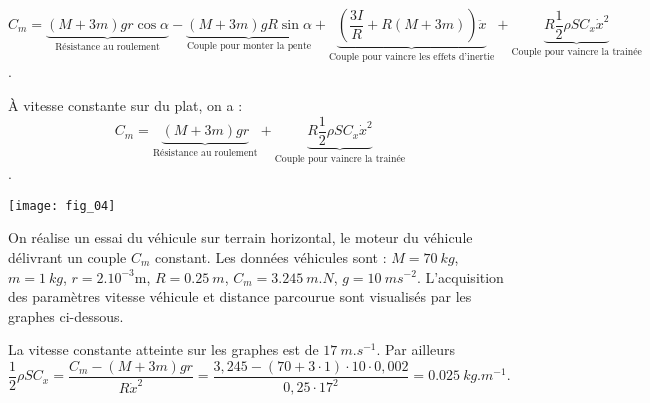 \ifprof
\begin{corrige}

$$C_m=\underbrace{\left(M+3m\right)gr \cos \alpha}_{\text{Résistance au roulement}}-\underbrace{\left(M+3m\right)gR\sin \alpha}_{\text{Couple pour monter la pente}}+\underbrace{\left(\dfrac{3I}{R}+R\left(M+3m\right)\right)\ddot{x}}_{\text{Couple pour vaincre les effets d'inertie}} + \underbrace{R\dfrac{1}{2}\rho S C_x \dot{x}^2}_{\text{Couple pour vaincre la trainée}}$$. 

\end{corrige}
\else
\fi


\ifprof
\begin{corrige}
À vitesse constante sur du plat, on a :
$$C_m=\underbrace{\left(M+3m\right)gr}_{\text{Résistance au roulement}} + \underbrace{R\dfrac{1}{2}\rho S C_x \dot{x}^2}_{\text{Couple pour vaincre la trainée}}$$. 
\end{corrige}
\else
\fi

\ifprof
\else

\begin{marginfigure}
\texttt{[image: fig\_04]}
\end{marginfigure}
On réalise un essai du véhicule sur terrain horizontal, le moteur du véhicule délivrant un couple $C_m$ constant.   
Les données véhicules sont :  $M = \SI{70}{kg}$, $m = \SI{1}{kg}$, $r = {2.10^{-3}}\text{m}$, $R = \SI{0,25}{m}$, $C_m= \SI{3,245}{m.N}$, $g = \SI{10}{ms^{-2}}$. L’acquisition des paramètres vitesse véhicule et distance parcourue sont visualisés par les graphes ci-dessous. 


\fi

\ifprof
\begin{corrige}
La vitesse constante atteinte sur les graphes est de $\SI{17}{m.s^{-1}}$.  Par ailleurs 
$\dfrac{1}{2}\rho S C_x=\dfrac{C_m-\left(M+3m\right)gr}{R\dot{x}^2} =\dfrac{3,245-\left(70+3\cdot 1\right)\cdot 10 \cdot 0,002}{0,25\cdot 17^2}=\SI{0,025}{kg.m^{-1}}.$
\end{corrige}
\else
\fi


\ifprof

